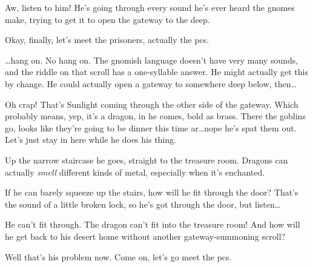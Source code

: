 \begin{multicols}{2}
\begin{exampletext}
Aw, listen to him!
He's going through every sound he's ever heard the gnomes make, trying to get it to open the gateway to the \gls{deep}.

Okay, finally, let's meet the prisoners, actually the \glspl{pc}.

\ldots hang on.
No hang on.
The gnomish language doesn't have very many sounds, and the riddle on that scroll has a one-syllable answer.
He might actually get this by change.
He could actually open a gateway to somewhere deep below, then\ldots

Oh crap!
That's Sunlight coming through the other side of the gateway.
Which probably means, yep, it's a dragon, in he comes, bold as brass.
There the goblins go, looks like they're going to be dinner this time ar\ldots nope he's spat them out.
Let's just stay in here while he does his thing.

Up the narrow staircase he goes, straight to the treasure room.
Dragons can actually \emph{smell} different kinds of metal, especially when it's enchanted.

If he can barely squeeze up the stairs, how will he fit through the door?
That's the sound of a little broken lock, so he's got through the door, but listen\ldots
{}

He can't fit through.
The dragon can't fit into the treasure room!
And how will he get back to his desert home without another gateway-summoning scroll?

Well that's his problem now.
Come on, let's go meet the \glspl{pc}.

\end{exampletext}
\end{multicols}
